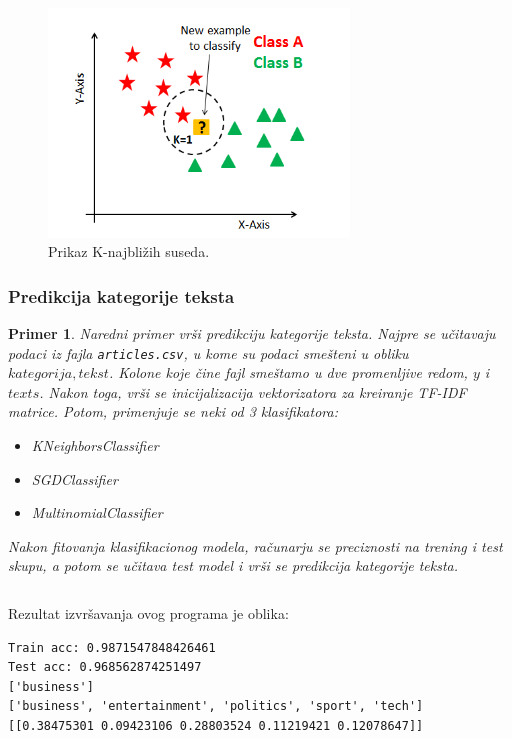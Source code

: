\documentclass[a4paper]{article}
\newtheorem{primer}{Primer}[section]
\begin{document}
\begin{figure}[t]
\includegraphics[width=8cm]{Pictures/slika2.png}
\centering
\caption{Prikaz K-najbližih suseda.}
\end{figure}
\newpage
\subsubsection{Predikcija kategorije teksta}
\begin{primer}
Naredni primer vrši predikciju kategorije teksta. Najpre se učitavaju podaci iz fajla \texttt{articles.csv}, u kome su podaci smešteni u obliku $kategorija, tekst$. Kolone koje čine fajl smeštamo u dve promenljive redom, $y$ i $texts$. Nakon toga, vrši se inicijalizacija vektorizatora za kreiranje TF-IDF matrice. Potom, primenjuje se neki od 3 klasifikatora:
\begin{itemize}
\item KNeighborsClassifier
\item SGDClassifier
\item MultinomialClassifier
\end{itemize}
Nakon fitovanja klasifikacionog modela, računarju se preciznosti na trening i test skupu, a potom se učitava test model i vrši se predikcija kategorije teksta. 
\end{primer}
\inputminted{python}{Codes/1/classifier.py}
Rezultat izvršavanja ovog programa je oblika:
\begin{lstlisting}
Train acc: 0.9871547848426461
Test acc: 0.968562874251497
['business']
['business', 'entertainment', 'politics', 'sport', 'tech']
[[0.38475301 0.09423106 0.28803524 0.11219421 0.12078647]]
\end{lstlisting}
\newpage
\end{document}
